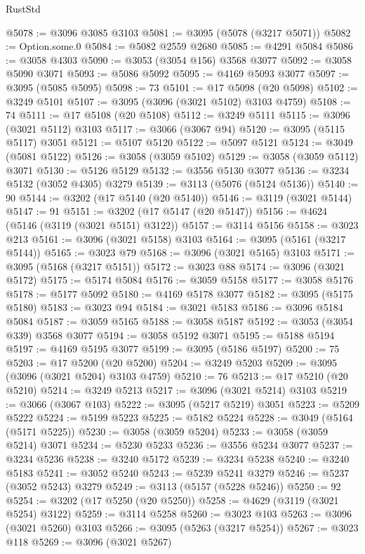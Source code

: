 \begin{lexlean}{RustStd}
\begin{coremodule}
@5078 := @3096 @3085 @3103
@5081 := @3095 (@5078 (@3217 @5071))
@5082 := Option.some.{0}
@5084 := @5082 @2559 @2680
@5085 := @4291 @5084
@5086 := @3058 @4303
@5090 := @3053 (@3054 @156) @3568 @3077
@5092 := @3058 @5090 @3071
@5093 := @5086 @5092
@5095 := @4169 @5093 @3077
@5097 := @3095 (@5085 @5095)
@5098 := 73
@5101 := @17 @5098 (@20 @5098)
@5102 := @3249 @5101
@5107 := @3095 (@3096 (@3021 @5102) @3103 @4759)
@5108 := 74
@5111 := @17 @5108 (@20 @5108)
@5112 := @3249 @5111
@5115 := @3096 (@3021 @5112) @3103
@5117 := @3066 (@3067 @94)
@5120 := @3095 (@5115 @5117) @3051
@5121 := @5107 @5120
@5122 := @5097 @5121
@5124 := @3049 (@5081 @5122)
@5126 := @3058 (@3059 @5102)
@5129 := @3058 (@3059 @5112) @3071
@5130 := @5126 @5129
@5132 := @3556 @5130 @3077
@5136 := @3234 @5132 (@3052 @4305) @3279
@5139 := @3113 (@5076 (@5124 @5136))
@5140 := 90
@5144 := @3202 (@17 @5140 (@20 @5140))
@5146 := @3119 (@3021 @5144)
@5147 := 91
@5151 := @3202 (@17 @5147 (@20 @5147))
@5156 := @4624 (@5146 (@3119 (@3021 @5151) @3122))
@5157 := @3114 @5156
@5158 := @3023 @213
@5161 := @3096 (@3021 @5158) @3103
@5164 := @3095 (@5161 (@3217 @5144))
@5165 := @3023 @79
@5168 := @3096 (@3021 @5165) @3103
@5171 := @3095 (@5168 (@3217 @5151))
@5172 := @3023 @88
@5174 := @3096 (@3021 @5172)
@5175 := @5174 @5084
@5176 := @3059 @5158
@5177 := @3058 @5176
@5178 := @5177 @5092
@5180 := @4169 @5178 @3077
@5182 := @3095 (@5175 @5180)
@5183 := @3023 @94
@5184 := @3021 @5183
@5186 := @3096 @5184 @5084
@5187 := @3059 @5165
@5188 := @3058 @5187
@5192 := @3053 (@3054 @339) @3568 @3077
@5194 := @3058 @5192 @3071
@5195 := @5188 @5194
@5197 := @4169 @5195 @3077
@5199 := @3095 (@5186 @5197)
@5200 := 75
@5203 := @17 @5200 (@20 @5200)
@5204 := @3249 @5203
@5209 := @3095 (@3096 (@3021 @5204) @3103 @4759)
@5210 := 76
@5213 := @17 @5210 (@20 @5210)
@5214 := @3249 @5213
@5217 := @3096 (@3021 @5214) @3103
@5219 := @3066 (@3067 @103)
@5222 := @3095 (@5217 @5219) @3051
@5223 := @5209 @5222
@5224 := @5199 @5223
@5225 := @5182 @5224
@5228 := @3049 (@5164 (@5171 @5225))
@5230 := @3058 (@3059 @5204)
@5233 := @3058 (@3059 @5214) @3071
@5234 := @5230 @5233
@5236 := @3556 @5234 @3077
@5237 := @3234 @5236
@5238 := @3240 @5172
@5239 := @3234 @5238
@5240 := @3240 @5183
@5241 := @3052 @5240
@5243 := @5239 @5241 @3279
@5246 := @5237 (@3052 @5243) @3279
@5249 := @3113 (@5157 (@5228 @5246))
@5250 := 92
@5254 := @3202 (@17 @5250 (@20 @5250))
@5258 := @4629 (@3119 (@3021 @5254) @3122)
@5259 := @3114 @5258
@5260 := @3023 @103
@5263 := @3096 (@3021 @5260) @3103
@5266 := @3095 (@5263 (@3217 @5254))
@5267 := @3023 @118
@5269 := @3096 (@3021 @5267)

\end{coremodule}
\end{lexlean}
